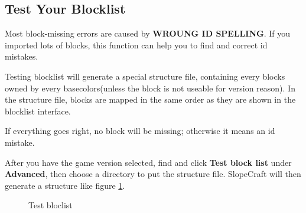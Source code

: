 \documentclass{article}
\begin{document}
    \subsection{Test Your Blocklist}
    Most block-missing errors are caused by \textbf{WROUNG ID SPELLING}. If you imported lots of blocks, this function can help you to find and correct id mistakes.

    Testing blocklist will generate a special structure file, containing every blocks owned by every basecolors(unless the block is not useable for version reason). In the structure file, blocks are mapped in the same order as they are shown in the blocklist interface.
    
    If everything goes right, no block will be missing; otherwise it means an id mistake.
    
    After you have the game version selected, find and click \textbf{Test block list} under \textbf{Advanced}, then choose a directory to put the structure file. SlopeCraft will then generate a structure like figure \ref*{testBlockListNBT}.

    \begin{figure}[htbp]
        \centering
        \caption{Test bloclist}
        \label{testBlockListNBT}
    \end{figure}
\end{document}
